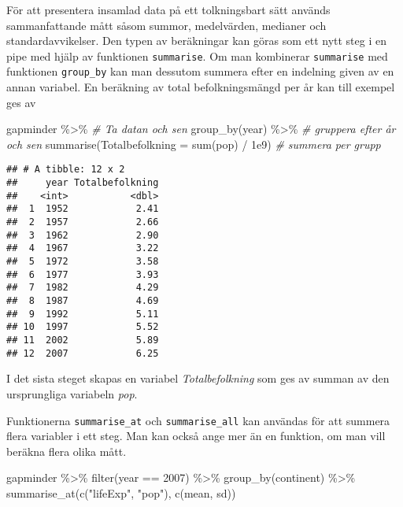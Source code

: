 \documentclass[
]{book}
\newenvironment{Shaded}{\begin{snugshade}}{\end{snugshade}}
\newcommand{\AttributeTok}[1]{\textcolor[rgb]{0.77,0.63,0.00}{#1}}
\newcommand{\CommentTok}[1]{\textcolor[rgb]{0.56,0.35,0.01}{\textit{#1}}}
\newcommand{\DecValTok}[1]{\textcolor[rgb]{0.00,0.00,0.81}{#1}}
\newcommand{\FloatTok}[1]{\textcolor[rgb]{0.00,0.00,0.81}{#1}}
\newcommand{\FunctionTok}[1]{\textcolor[rgb]{0.00,0.00,0.00}{#1}}
\newcommand{\NormalTok}[1]{#1}
\newcommand{\SpecialCharTok}[1]{\textcolor[rgb]{0.00,0.00,0.00}{#1}}
\newcommand{\StringTok}[1]{\textcolor[rgb]{0.31,0.60,0.02}{#1}}
\theoremstyle{definition}
\theoremstyle{definition}
\theoremstyle{definition}
\theoremstyle{definition}
\theoremstyle{remark}
\begin{document}
För att presentera insamlad data på ett tolkningsbart sätt används sammanfattande mått såsom summor, medelvärden, medianer och standardavvikelser.
Den typen av beräkningar kan göras som ett nytt steg i en pipe med hjälp av funktionen \texttt{summarise}. Om man kombinerar \texttt{summarise} med funktionen \texttt{group\_by} kan man dessutom summera efter en indelning given av en annan variabel. En beräkning av total befolkningsmängd per år kan till exempel ges av

\begin{Shaded}
\begin{Highlighting}[]
\NormalTok{gapminder }\SpecialCharTok{\%\textgreater{}\%}                           \CommentTok{\# Ta datan och sen}
  \FunctionTok{group\_by}\NormalTok{(year) }\SpecialCharTok{\%\textgreater{}\%}                    \CommentTok{\# gruppera efter år och sen}
  \FunctionTok{summarise}\NormalTok{(}\AttributeTok{Totalbefolkning =} \FunctionTok{sum}\NormalTok{(pop) }\SpecialCharTok{/} \FloatTok{1e9}\NormalTok{) }\CommentTok{\# summera per grupp}
\end{Highlighting}
\end{Shaded}

\begin{verbatim}
## # A tibble: 12 x 2
##     year Totalbefolkning
##    <int>           <dbl>
##  1  1952            2.41
##  2  1957            2.66
##  3  1962            2.90
##  4  1967            3.22
##  5  1972            3.58
##  6  1977            3.93
##  7  1982            4.29
##  8  1987            4.69
##  9  1992            5.11
## 10  1997            5.52
## 11  2002            5.89
## 12  2007            6.25
\end{verbatim}

I det sista steget skapas en variabel \emph{Totalbefolkning} som ges av summan av den ursprungliga variabeln \emph{pop}.

Funktionerna \texttt{summarise\_at} och \texttt{summarise\_all} kan användas för att summera flera variabler i ett steg. Man kan också ange mer än en funktion, om man vill beräkna flera olika mått.

\begin{Shaded}
\begin{Highlighting}[]
\NormalTok{gapminder }\SpecialCharTok{\%\textgreater{}\%} 
  \FunctionTok{filter}\NormalTok{(year }\SpecialCharTok{==} \DecValTok{2007}\NormalTok{) }\SpecialCharTok{\%\textgreater{}\%} 
  \FunctionTok{group\_by}\NormalTok{(continent) }\SpecialCharTok{\%\textgreater{}\%} 
  \FunctionTok{summarise\_at}\NormalTok{(}\FunctionTok{c}\NormalTok{(}\StringTok{"lifeExp"}\NormalTok{, }\StringTok{"pop"}\NormalTok{), }\FunctionTok{c}\NormalTok{(mean, sd))}
\end{Highlighting}
\end{Shaded}
\end{document}
